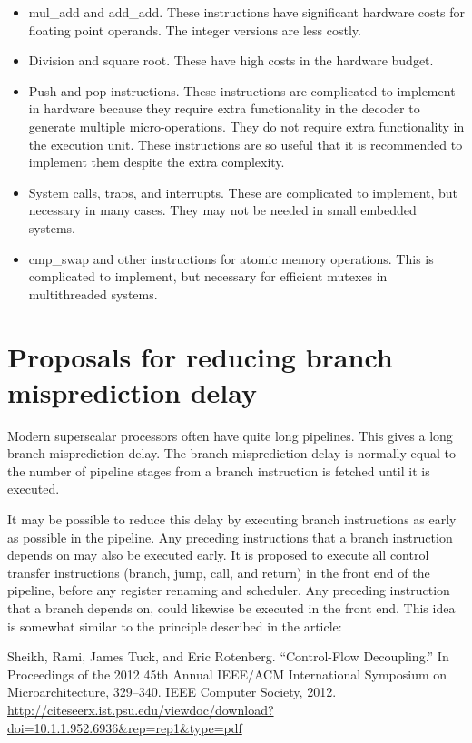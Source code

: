 \documentclass[forwardcom.tex]{subfiles}
\begin{document}
\begin{itemize}
\item mul\_add and add\_add. These instructions have significant hardware costs for floating point operands. The integer versions are less costly.

\item Division and square root. These have high costs in the hardware budget.

\item Push and pop instructions. These instructions are complicated to implement in hardware because they require extra functionality in the decoder to generate multiple micro-operations. They do not require extra functionality in the execution unit. These instructions are so useful that it is recommended to implement them despite the extra complexity.

\item System calls, traps, and interrupts. These are complicated to implement, but necessary in many cases. They may not be needed in small embedded systems.

\item cmp\_swap and other instructions for atomic memory operations. This is complicated to implement, but necessary for efficient mutexes in multithreaded systems.

\end{itemize}


\section{Proposals for reducing branch misprediction delay}\label{branchProposal}
Modern superscalar processors often have quite long pipelines. This gives a long branch misprediction delay. The branch misprediction delay is normally equal to the number of pipeline stages from a branch instruction is fetched until it is executed.
\vv

It may be possible to reduce this delay by executing branch instructions as early as possible in the pipeline. Any preceding instructions that a branch instruction depends on may also be executed early. It is proposed to execute all control transfer instructions (branch, jump, call, and return) in the front end of the pipeline, before any register renaming and scheduler. Any preceding instruction that a branch depends on, could likewise be executed in the front end. This idea is somewhat similar to the principle described in the article:

Sheikh, Rami, James Tuck, and Eric Rotenberg. “Control-Flow Decoupling.” In Proceedings of the 2012 45th Annual IEEE/ACM International Symposium on Microarchitecture, 329–340. IEEE Computer Society, 2012.
\url{http://citeseerx.ist.psu.edu/viewdoc/download?doi=10.1.1.952.6936&rep=rep1&type=pdf}
\vv
\end{document}
